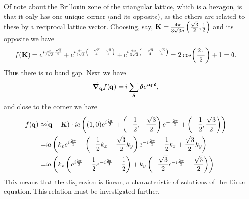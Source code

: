 Of note about the Brillouin zone of the triangular lattice, which is a hexagon, is that it only has one unique corner (and its opposite), as the others are related to these by a reciprocal lattice vector. Choosing, say, $\vb{K} = \frac{4\pi}{3\sqrt{3}a}\left(\frac{\sqrt{3}}{2}, \frac{1}{2}\right)$ and its opposite we have
\begin{align*}
	f(\vb{K}) = e^{i\frac{4\pi}{3\sqrt{3}}\frac{\sqrt{3}}{2}} + e^{i\frac{4\pi}{3\sqrt{3}}\left(-\frac{\sqrt{3}}{4} - \frac{\sqrt{3}}{4}\right)} + e^{i\frac{4\pi}{3\sqrt{3}}\left(-\frac{\sqrt{3}}{4} + \frac{\sqrt{3}}{4}\right)} = 2\cos(\frac{2\pi}{3}) + 1 = 0.
\end{align*}
Thus there is no band gap. Next we have
\begin{align*}
	\grad_{\vb{q}}f(\vb{q}) = i\sum\limits_{\vb*{\delta}}\vb*{\delta}e^{i\vb{q}\cdot\vb*{\delta}},
\end{align*}
and close to the corner we have
\begin{align*}
	f(\vb{q}) \approx& (\vb{q} - \vb{K})\cdot ia\left((1, 0)e^{i\frac{2\pi}{3}} + \left(-\frac{1}{2}, -\frac{\sqrt{3}}{2}\right)e^{-i\frac{2\pi}{3}} + \left(-\frac{1}{2}, \frac{\sqrt{3}}{2}\right)\right) \\
	                =& ia\left(k_{x}e^{i\frac{2\pi}{3}} + \left(-\frac{1}{2}k_{x} - \frac{\sqrt{3}}{2}k_{y}\right)e^{-i\frac{2\pi}{3}} - \frac{1}{2}k_{x} + \frac{\sqrt{3}}{2}k_{y}\right) \\
	                =& ia\left(k_{x}\left(e^{i\frac{2\pi}{3}} - \frac{1}{2}e^{-i\frac{2\pi}{3}} - \frac{1}{2}\right) + k_{y}\left(-\frac{\sqrt{3}}{2}e^{-i\frac{2\pi}{3}} + \frac{\sqrt{3}}{2}\right)\right).
\end{align*}
This means that the dispersion is linear, a characteristic of solutions of the Dirac equation. This relation must be investigated further.

